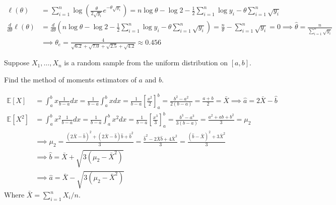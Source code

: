 \documentclass{article}
\newcommand{\E}{\mathbb{E}}
\begin{document}
\begin{probset}
\begin{prob}[\textbf{5.2.6}]
    \begin{soln}
        \begin{align*}
            \ell(\theta) &= \sum_{i=1}^n \log \left( \frac{\theta}{2\sqrt{y_i}} e^{-\theta \sqrt{y_i}} \right) = n\log \theta - \log 2 - \frac{1}{2} \sum_{i=1}^n \log y_i - \theta \sum_{i=1}^n \sqrt{y_i} \\
            \frac{d}{d\theta} \ell(\theta) &= \frac{d}{d\theta} \left( n\log \theta - \log 2 - \frac{1}{2} \sum_{i=1}^n \log y_i - \theta \sum_{i=1}^n \sqrt{y_i} \right) = \frac{n}{\theta} - \sum_{i=1}^n \sqrt{y_i} = 0 \implies \hat\theta = \frac{n}{\sum_{i=1}^n \sqrt{y_i}} \\
            &\implies \theta_e = \frac{4}{\sqrt{6.2} + \sqrt{7.0} + \sqrt{2.5} + \sqrt{4.2}} \approx 0.456
        \end{align*}
    \end{soln}
\end{prob}

\newpage

\begin{prob}
    Suppose $X_1, \ldots, X_n$ is a random sample from the uniform distribution on $[a, b]$.
    \begin{subprobset}
        \begin{subprob}
            Find the method of moments estimators of $a$ and $b$.

            \begin{soln}
                \begin{align*}
                    \E[X] &= \int_a^b x \frac{1}{b-a} dx = \frac{1}{b-a} \int_a^b x dx = \frac{1}{b-a} \left[ \frac{x^2}{2} \right]_a^b = \frac{b^2 - a^2}{2(b-a)} = \frac{a+b}{2} = \bar{X} \implies \hat{a} = 2\bar{X} - \hat{b} \\
                    \E[X^2] &= \int_a^b x^2 \frac{1}{b-a} dx = \frac{1}{b-a} \int_a^b x^2 dx = \frac{1}{b-a} \left[ \frac{x^3}{3} \right]_a^b = \frac{b^3 - a^3}{3(b-a)} = \frac{a^2 + ab + b^2}{3} = \mu_2 \\
                    &\implies \mu_2 = \frac{(2\bar{X} - \hat{b})^2 + (2\bar{X} - \hat{b})\hat{b} + \hat{b}^2}{3} = \frac{\hat{b}^2 - 2\bar{X}\hat{b} + 4\bar{X}^2}{3} = \frac{(\hat{b} - \bar{X})^2 + 3\bar{X}^2}{3} \\
                    &\implies \hat{b} = \bar{X} + \sqrt{3(\mu_2 - \bar{X}^2)} \\
                    &\implies \hat{a} = \bar{X} - \sqrt{3(\mu_2 - \bar{X}^2)}
                \end{align*}
                Where $\bar{X} = \sum_{i=1}^n X_i / n$.
            \end{soln}
        \end{subprob}


\end{subprobset}
\end{prob}
\end{probset}
\end{document}
